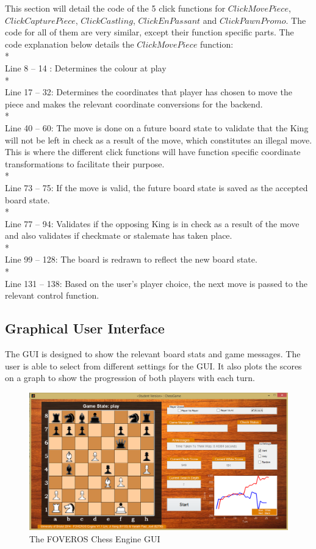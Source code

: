 \documentclass[11pt,a4paper]{article}
\begin{document}
This section will detail the code of the 5 click functions for $ClickMovePiece$, $ClickCapturePiece$, $ClickCastling$, $ClickEnPassant$ and $ClickPawnPromo$. The code for all of them are very similar, except their function specific parts. The code explanation below details the $ClickMovePiece$ function:
\\*\\
Line 8 – 14 : Determines the colour at play
\\*\\
Line 17 – 32: Determines the coordinates that player has chosen to move the piece and makes the relevant coordinate conversions for the backend.
\\*\\
Line 40 – 60: The move is done on a future board state to validate that the King will not be left in check as a result of the move, which constitutes an illegal move. This is where the different click functions will have function specific coordinate transformations to facilitate their purpose.
\\*\\
Line 73 – 75: If the move is valid, the future board state is saved as the accepted board state.
\\*\\
Line 77 – 94: Validates if the opposing King is in check as a result of the move and also validates if checkmate or stalemate has taken place.
\\*\\
Line 99 – 128: The board is redrawn to reflect the new board state.
\\*\\
Line 131 – 138: Based on the user’s player choice, the next move is passed to the relevant control function.


\subsection{Graphical User Interface}
The GUI is designed to show the relevant board stats and game messages. The user is able to select from different settings for the GUI. It also plots the scores on a graph to show the progression of both players with each turn.
\begin{figure}[H]
\centering
\includegraphics[width=1\textwidth]{GUI}
\caption{The FOVEROS Chess Engine GUI}
\label{fig:chess1}
\end{figure}
\end{document}
